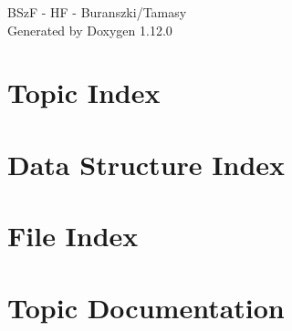 \documentclass[twoside]{book}
\newcommand{\+}{\discretionary{\mbox{\scriptsize$\hookleftarrow$}}{}{}}
\newcommand{\clearemptydoublepage}{%
    \newpage{\pagestyle{empty}\cleardoublepage}%
  }
\begin{document}
  \raggedbottom
    \hypersetup{pageanchor=false,
                bookmarksnumbered=true,
                pdfencoding=unicode
               }
  \begin{titlepage}
  \vspace*{7cm}
  \begin{center}%
  {\Large BSz\+F -\/ HF -\/ Buranszki/\+Tamasy}\\
  \vspace*{1cm}
  {\large Generated by Doxygen 1.12.0}\\
  \end{center}
  \end{titlepage}
  \clearemptydoublepage
  \tableofcontents
  \clearemptydoublepage
  \hypersetup{pageanchor=true}





\chapter{Topic Index}

\chapter{Data Structure Index}

\chapter{File Index}

\chapter{Topic Documentation}


















\end{document}
